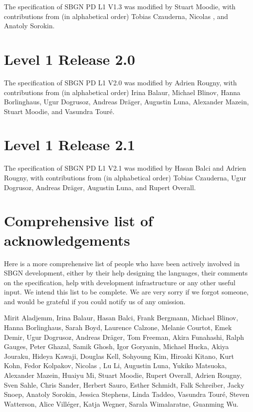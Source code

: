 The specification of SBGN PD L1 V1.3 was modified by Stuart Moodie, with contributions from (in alphabetical order) Tobias Czauderna, Nicolas \lenov{}, and Anatoly Sorokin.

\section{Level 1 Release 2.0}

The specification of SBGN PD L1 V2.0 was modified by Adrien Rougny, with contributions from (in alphabetical order) Irina Balaur, Michael Blinov, Hanna Borlinghaus, Ugur Dogrusoz, Andreas Dräger, Augustin Luna, Alexander Mazein, Stuart Moodie, and Vasundra Touré.

\section{Level 1 Release 2.1}

The specification of SBGN PD L1 V2.1 was modified by Hasan Balci and Adrien Rougny, with contributions from (in alphabetical order) Tobias Czauderna, Ugur Dogrusoz, Andreas Dräger, Augustin Luna, and Rupert Overall.


\section{Comprehensive list of acknowledgements}

Here is a more comprehensive list of people who have been actively involved in SBGN development, either by their help designing the languages, their comments on the specification, help with development infrastructure or any other useful input.  We intend this list to be complete. We are very sorry if we forgot someone, and would be grateful if you could notify us of any omission.

Mirit Aladjemm, Irina Balaur, Hasan Balci, Frank Bergmann, Michael Blinov, Hanna Borlinghaus, Sarah Boyd, Laurence Calzone, Melanie Courtot, Emek Demir, Ugur Dogrusoz, Andreas Dräger, Tom Freeman, Akira Funahashi, Ralph Gauges, Peter Ghazal, Samik Ghosh, Igor Goryanin, Michael Hucka, Akiya Jouraku, Hideya Kawaji, Douglas Kell, Sohyoung Kim, Hiroaki Kitano, Kurt Kohn, Fedor Kolpakov, Nicolas \lenov{}, Lu Li, Augustin Luna, Yukiko Matsuoka, Alexander Mazein, Huaiyu Mi, Stuart Moodie, Rupert Overall, Adrien Rougny, Sven Sahle, Chris Sander, Herbert Sauro, Esther Schmidt, Falk Schreiber, Jacky Snoep, Anatoly Sorokin, Jessica Stephens, Linda Taddeo, Vasundra Touré, Steven Watterson, Alice Vill\'{e}ger, Katja Wegner, Sarala Wimalaratne, Guanming Wu.


